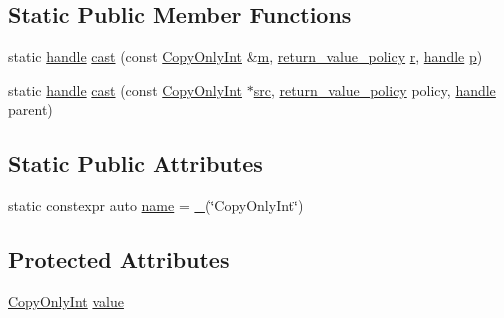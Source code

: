 \subsection*{Static Public Member Functions}
\begin{DoxyCompactItemize}
\item 
static \mbox{\hyperlink{classhandle}{handle}} \mbox{\hyperlink{structtype__caster_3_01_copy_only_int_01_4_ab24bacf3d721f0ba09b53b0ee2af1fc8}{cast}} (const \mbox{\hyperlink{class_copy_only_int}{Copy\+Only\+Int}} \&\mbox{\hyperlink{_s_d_l__opengl__glext_8h_af593500c283bf1a787a6f947f503a5c2}{m}}, \mbox{\hyperlink{detail_2common_8h_adde72ab1fb0dd4b48a5232c349a53841}{return\+\_\+value\+\_\+policy}} \mbox{\hyperlink{_s_d_l__opengl_8h_a42ce7cdc612e53abee15043f80220d97}{r}}, \mbox{\hyperlink{classhandle}{handle}} \mbox{\hyperlink{_s_d_l__opengl__glext_8h_aa5367c14d90f462230c2611b81b41d23}{p}})
\item 
static \mbox{\hyperlink{classhandle}{handle}} \mbox{\hyperlink{structtype__caster_3_01_copy_only_int_01_4_ae7a27e2db8a50ce98db7d7bd909a7138}{cast}} (const \mbox{\hyperlink{class_copy_only_int}{Copy\+Only\+Int}} $\ast$\mbox{\hyperlink{_s_d_l__opengl__glext_8h_a72e0fdf0f845ded60b1fada9e9195cd7}{src}}, \mbox{\hyperlink{detail_2common_8h_adde72ab1fb0dd4b48a5232c349a53841}{return\+\_\+value\+\_\+policy}} policy, \mbox{\hyperlink{classhandle}{handle}} parent)
\end{DoxyCompactItemize}
\subsection*{Static Public Attributes}
\begin{DoxyCompactItemize}
\item 
static constexpr auto \mbox{\hyperlink{structtype__caster_3_01_copy_only_int_01_4_a728891b996e5f554fa8c6de7e8238c78}{name}} = \mbox{\hyperlink{descr_8h_af114703e20c6527e87163eb2798f74b8}{\+\_\+}}(\char`\"{}Copy\+Only\+Int\char`\"{})
\end{DoxyCompactItemize}
\subsection*{Protected Attributes}
\begin{DoxyCompactItemize}
\item 
\mbox{\hyperlink{class_copy_only_int}{Copy\+Only\+Int}} \mbox{\hyperlink{structtype__caster_3_01_copy_only_int_01_4_a9c13bec252988adc1855d774068c2020}{value}}
\end{DoxyCompactItemize}


